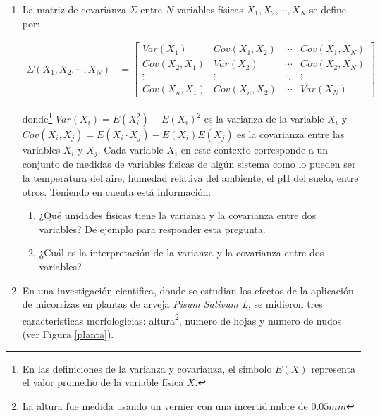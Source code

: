 \documentclass{article}
\begin{document}
\begin{enumerate}
\item La matriz de covarianza $\Sigma$ entre $N$ variables físicas $X_{1},X_{2},\cdots, X_{N}$ se define por:

\begin{align*}
\Sigma(X_{1},X_{2},\cdots, X_{N})&=\left[\begin{matrix}
Var(X_{1}) & Cov(X_{1},X_{2}) & \cdots & Cov(X_{1},X_{N})\\
Cov(X_{2},X_{1}) & Var(X_{2}) & \cdots & Cov(X_{2},X_{N})\\
\vdots & \vdots & \ddots & \vdots \\
Cov(X_{n},X_{1}) & Cov(X_{n},X_{2}) & \cdots & Var(X_{N})
\end{matrix}\right]
\end{align*}

\noindent donde\footnote{En las definiciones de la varianza y covarianza, el simbolo $E(X)$ representa el valor promedio de la variable física $X$.} $Var(X_{i})=E(X_{i}^2)-E(X_{i})^2$ es la varianza de la variable $X_{i}$ y $Cov(X_{i},X_{j})=E(X_{i}\cdot X_{j})-E(X_{i})E(X_{j})$ es la covarianza entre las variables $X_{i}$ y $X_{j}$. Cada variable $X_{i}$ en este contexto corresponde a un conjunto de medidas de variables físicas de algún sistema como lo pueden ser la temperatura del aire, humedad relativa del ambiente, el pH del suelo, entre otros. Teniendo en cuenta está información: 

\begin{enumerate}
\item ¿Qué unidades físicas tiene la varianza y la covarianza entre dos variables? De ejemplo para responder esta pregunta.
\item ¿Cuál es la interpretación de la varianza y la covarianza entre dos variables?
\end{enumerate}


\item En una investigación cientifica, donde se estudian los efectos de la aplicación de micorrizas en plantas de arveja \textit{Pisum Sativum L}, se midieron tres caracteristicas morfologicias: altura\footnote{La altura fue medida usando un vernier con una incertidumbre de $0.05mm$}, numero de hojas y numero de nudos (ver Figura \ref{planta}).  


\end{enumerate}
\end{document}
